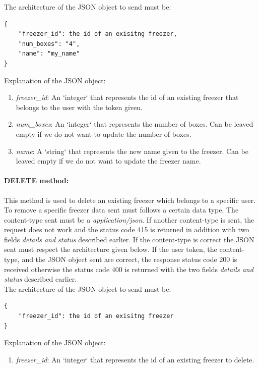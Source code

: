 The architecture of the JSON object to send must be:
\begin{lstlisting}
{
    "freezer_id": the id of an exisitng freezer,
    "num_boxes": "4",
    "name": "my_name"
}
\end{lstlisting}

Explanation of the  JSON object:
\begin{enumerate}
\item \textit{freezer\_id}: An `integer` that represents the id of an existing freezer that belongs to the user with the token given.
\item \textit{num\_boxes}: An `integer` that represents the number of boxes. Can be leaved empty if we do not want to update the number of boxes.
\item \textit{name}: A `string` that represents the new name given to the freezer. Can be leaved empty if we do not want to update the freezer name.
\end{enumerate}

\paragraph{DELETE method:} This method is used to delete an existing freezer which belongs to a specific user. To remove a specific freezer data sent must follows a certain data type.  The content-type sent must be a \textit{application/json}. If another content-type is sent, the request does not work and the status code 415 is returned in addition with two fields \textit{details and status} described earlier. If the content-type is correct the JSON sent must respect the architecture given below. If the user token, the content-type, and the JSON object sent are correct, the response status code 200 is received otherwise the status code 400 is returned with the two fields \textit{details and status} described earlier.\\

The architecture of the JSON object to send must be:
\begin{lstlisting}
{
    "freezer_id": the id of an exisitng freezer
}
\end{lstlisting}

Explanation of the  JSON object:
\begin{enumerate}
\item \textit{freezer\_id}: An `integer` that represents the id of an existing freezer to delete.
\end{enumerate}

